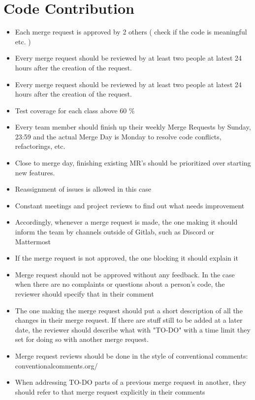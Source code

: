 \documentclass{article}
\begin{document}
\section{Code Contribution}
    \begin{itemize}
        \item Each merge request is approved by 2 others ( check if the code is meaningful etc. )
        \item Every merge request should be reviewed by at least two people at latest 24 hours after the creation of the request.
        \item Every merge request should be reviewed by at least two people at latest 24 hours after the creation of the request.
        \item Test coverage for each class above 60 $\%$
        \item Every team member should finish up their weekly Merge Requests by Sunday, 23:59 and the actual Merge Day is Monday to resolve code conflicts, refactorings, etc.
        \item Close to merge day, finishing existing MR's should be prioritized over starting new features.
        \item Reassignment of issues is allowed in this case
        \item Constant meetings and project reviews to find out what needs improvement
        \item Accordingly, whenever a merge request is made, the one making it should inform the team by channels outside of Gitlab, such as Discord or Mattermost
        \item If the merge request is not approved, the one blocking it should explain it
        \item Merge request should not be approved without any feedback. In the case when there are no complaints or questions about a person's code, the reviewer should specify that in their comment
        \item The one making the merge request should put a short description of all the changes in their merge request. If there are stuff still to be added at a later date, the reviewer should describe what with "TO-DO" with a time limit they set for doing so with another merge request.
        \item Merge request reviews should be done in the style of conventional comments: conventionalcomments.org/
        \item When addressing TO-DO parts of a previous merge request in another, they should refer to that merge request explicitly in their comments

\end{itemize}
\end{document}
